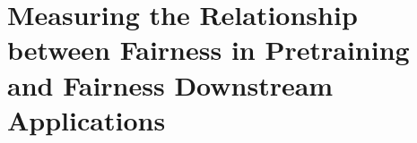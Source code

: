 \part{Measuring the Relationship between Fairness in Pretraining and Fairness Downstream Applications}\label{part:measurement}